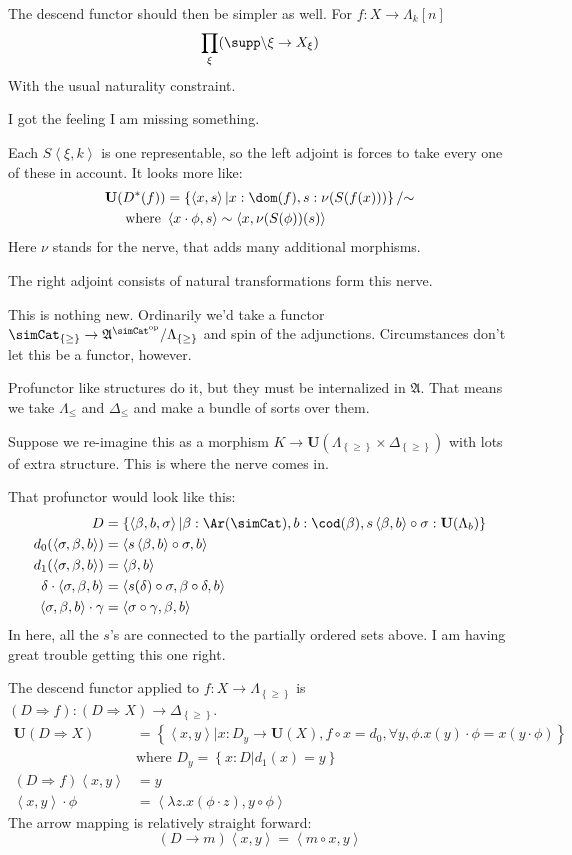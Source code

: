 \documentclass{tac}
\newcommand\set[1]{\left\{#1\right\}}
\newcommand\ri{^*}
\newcommand\dual{^{\mathrm{op}}}
\newcommand\s{^{\simCat\dual}}
\newcommand\of{:}
\newcommand\simplex\Delta
\newcommand\horn\Lambda
\newcommand\tuplet[1]{\left\langle #1 \right\rangle}
\newcommand\base{\mathbf{U}}
\newcommand\ambient{\mathfrak A}
\begin{document}
The descend functor should then be simpler as well. For $f\of X\to\horn_k[n]$
\[ \prod_\xi(\supp \backslash \xi \to X_\xi) \]
With the usual naturality constraint.

I got the feeling I am missing something.

Each $S\tuplet{\xi,k}$ is one representable, so the left adjoint
is forces to take every one of these in account.
It looks more like: 
\begin{align*}
\base(D\ri(f)) &= \set{ \tuplet{x,s} | x\of\dom(f),s \of \nu(S(f(x)))}/{\mathord\sim}\\
\textrm{where } & \tuplet{x\cdot\phi,s} \sim \tuplet{x,\nu(S(\phi))(s)}
\end{align*}
Here $\nu$ stands for the nerve, that adds many additional morphisms.

The right adjoint consists of natural transformations form this nerve.

This is nothing new. Ordinarily we'd take a functor $\simCat_{\set\geq}\to\ambient\s/\horn_{\set\geq}$ and spin of the adjunctions. Circumstances don't let this be a functor, however.

Profunctor like structures do it, but they must be internalized in
$\ambient$. That means we take $\horn_\leq$ and $\simplex_\leq$ and make
a bundle of sorts over them.

Suppose we re-imagine this as a morphism $K\to \base(\horn_{\set\geq}\times\simplex_{\set\geq})$ with lots of extra structure. This is where the nerve comes in.

That profunctor would look like this:
\begin{align*}
D &= \set{\tuplet{\beta,b,\sigma}|
\beta\of\Ar(\simCat),
b\of \cod(\beta),
s\tuplet{\beta,b}\circ \sigma\of \base(\horn_b)}\\
d_0(\tuplet{\sigma,\beta,b})&=\tuplet{s\tuplet{\beta,b}\circ\sigma,b}\\
d_1(\tuplet{\sigma,\beta,b})&=\tuplet{\beta,b}\\
\delta\cdot\tuplet{\sigma,\beta,b}&=
\tuplet{s(\delta)\circ\sigma,\beta\circ\delta,b}\\
\tuplet{\sigma,\beta,b}\cdot\gamma&=
\tuplet{\sigma\circ \gamma,\beta,b}
\end{align*}
In here, all the $s$'s are connected to the partially ordered sets above.
I am having great trouble getting this one right.

\newcommand\To{\mathbin\Rightarrow}
The descend functor applied to $f\of X\to \horn_{\set\geq}$ is 
$(D\To f)\of (D\To X) \to \simplex_{\set\geq}$.
\begin{align*}
\base(D\To X) &= \set{\tuplet{x,y}|
x\of D_y \to \base(X),
f\circ x = d_0,
\forall y,\phi.x(y)\cdot\phi = x(y\cdot \phi)}\\
& \textrm{where }D_y = \set{x\of D|d_1(x)=y}\\
(D\To f)\tuplet{x,y} &= y\\
\tuplet{x,y}\cdot\phi &= \tuplet{\lambda z.x(\phi\cdot z),y\circ\phi}
\end{align*}
The arrow mapping is relatively straight forward:
\[ (D\to m)\tuplet{x,y} = \tuplet{m\circ x, y} \]
\end{document}
